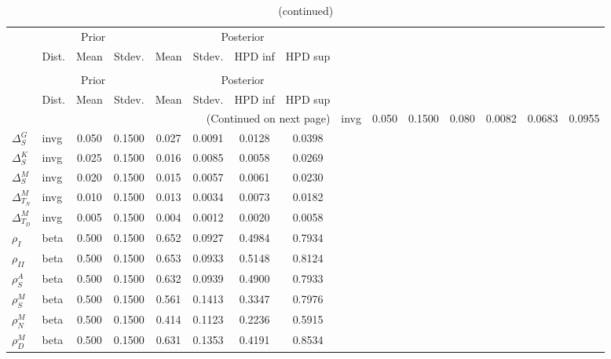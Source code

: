  
\begin{center}
\begin{longtable}{llcccccc} 
\caption{Results from Metropolis-Hastings (parameters)}
 \label{Table:MHPosterior:1}\\
\toprule 
  & \multicolumn{3}{c}{Prior}  &  \multicolumn{4}{c}{Posterior} \\
  \cmidrule(r{.75em}){2-4} \cmidrule(r{.75em}){5-8}
  & Dist. & Mean  & Stdev. & Mean & Stdev. & HPD inf & HPD sup\\
\midrule \endfirsthead 
\caption{(continued)}\\\toprule 
  & \multicolumn{3}{c}{Prior}  &  \multicolumn{4}{c}{Posterior} \\
  \cmidrule(r{.75em}){2-4} \cmidrule(r{.75em}){5-8}
  & Dist. & Mean  & Stdev. & Mean & Stdev. & HPD inf & HPD sup\\
\midrule \endhead 
\bottomrule \multicolumn{8}{r}{(Continued on next page)} \endfoot 
\bottomrule \endlastfoot 
${\Delta^{A}_{S}}$ & invg &   0.050 & 0.1500 &   0.080& 0.0082 &  0.0683 &  0.0955 \\ 
${\Delta^{G}_{S}}$ & invg &   0.050 & 0.1500 &   0.027& 0.0091 &  0.0128 &  0.0398 \\ 
${\Delta^{K}_{S}}$ & invg &   0.025 & 0.1500 &   0.016& 0.0085 &  0.0058 &  0.0269 \\ 
${\Delta^{M}_{S}}$ & invg &   0.020 & 0.1500 &   0.015& 0.0057 &  0.0061 &  0.0230 \\ 
${\Delta^{M}_{T_N}}$ & invg &   0.010 & 0.1500 &   0.013& 0.0034 &  0.0073 &  0.0182 \\ 
${\Delta^{M}_{T_D}}$ & invg &   0.005 & 0.1500 &   0.004& 0.0012 &  0.0020 &  0.0058 \\ 
${\rho_{I}}$ & beta &   0.500 & 0.1500 &   0.652& 0.0927 &  0.4984 &  0.7934 \\ 
${\rho_{II}}$ & beta &   0.500 & 0.1500 &   0.653& 0.0933 &  0.5148 &  0.8124 \\ 
${\rho^{A}_{S}}$ & beta &   0.500 & 0.1500 &   0.632& 0.0939 &  0.4900 &  0.7933 \\ 
${\rho^{M}_{S}}$ & beta &   0.500 & 0.1500 &   0.561& 0.1413 &  0.3347 &  0.7976 \\ 
${\rho^{M}_{N}}$ & beta &   0.500 & 0.1500 &   0.414& 0.1123 &  0.2236 &  0.5915 \\ 
${\rho^{M}_{D}}$ & beta &   0.500 & 0.1500 &   0.631& 0.1353 &  0.4191 &  0.8534 \\ 
\end{longtable}
 \end{center}

